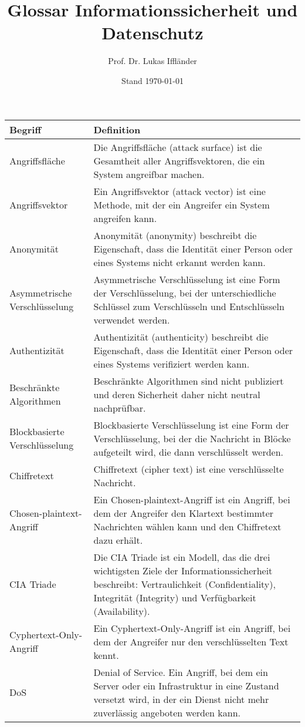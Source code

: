 \documentclass{scrartcl}
\title{Glossar Informationssicherheit und Datenschutz}
\author{Prof. Dr. Lukas Iffländer}
\date{Stand \today}
\begin{document}
\maketitle

\begin{xltabular}{\textwidth}{lX}
    \toprule
    Begriff & Definition \\
    \midrule
    \endhead
    \bottomrule
    \endfoot
    Angriffsfläche & Die Angriffsfläche (attack surface) ist die Gesamtheit aller Angriffsvektoren, die ein System angreifbar machen. \\
    Angriffsvektor & Ein Angriffsvektor (attack vector) ist eine Methode, mit der ein Angreifer ein System angreifen kann. \\
    Anonymität & Anonymität (anonymity) beschreibt die Eigenschaft, dass die Identität einer Person oder eines Systems nicht erkannt werden kann. \\
    Asymmetrische Verschlüsselung & Asymmetrische Verschlüsselung ist eine Form der Verschlüsselung, bei der unterschiedliche Schlüssel zum Verschlüsseln und Entschlüsseln verwendet werden. \\
    Authentizität & Authentizität (authenticity) beschreibt die Eigenschaft, dass die Identität einer Person oder eines Systems verifiziert werden kann. \\
    Beschränkte Algorithmen & Beschränkte Algorithmen sind nicht publiziert und deren Sicherheit daher nicht neutral nachprüfbar. \\
    Blockbasierte Verschlüsselung & Blockbasierte Verschlüsselung ist eine Form der Verschlüsselung, bei der die Nachricht in Blöcke aufgeteilt wird, die dann verschlüsselt werden. \\
    Chiffretext & Chiffretext (cipher text) ist eine verschlüsselte Nachricht. \\
    Chosen-plaintext-Angriff & Ein Chosen-plaintext-Angriff ist ein Angriff, bei dem der Angreifer den Klartext bestimmter Nachrichten wählen kann und den Chiffretext dazu erhält. \\
    CIA Triade & Die CIA Triade ist ein Modell, das die drei wichtigsten Ziele der Informationssicherheit beschreibt: Vertraulichkeit (Confidentiality), Integrität (Integrity) und Verfügbarkeit (Availability). \\
    Cyphertext-Only-Angriff & Ein Cyphertext-Only-Angriff ist ein Angriff, bei dem der Angreifer nur den verschlüsselten Text kennt. \\
    DoS & Denial of Service. Ein Angriff, bei dem ein Server oder ein Infrastruktur in eine Zustand versetzt wird, in der ein Dienst nicht mehr zuverlässig angeboten werden kann. \\

\end{xltabular}
\end{document}

